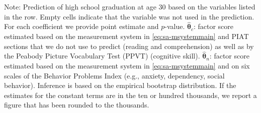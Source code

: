\documentclass[static]{JJH-Beamer}
\begin{document}
\begin{frame}
\begin{table}[H]
\begin{center}
{\begin{tabular}{lcccccccc}
\bottomrule
\end{tabular}
}
\end{center}
\tiny \flushleft
Note: Prediction of high school graduation at age 30 based on the variables listed in the row. Empty cells indicate that the variable was not used in the prediction. For each coefficient we provide point estimate and $p$-value. $\hat{\bm{\theta}}_{c}$: factor score estimated based on the measurement system in \eqref{eq:sa-msystemmain} and PIAT sections that we do not use to predict (reading and comprehension) as well as by the Peabody Picture Vocabulary Test (PPVT) (cognitive skill). $\hat{\bm{\theta}}_{n}$: factor score estimated based on the measurement system in \eqref{eq:sa-msystemmain} and on six scales of the Behavior Problems Index (e.g., anxiety, dependency, social behavior). Inference is based on the empirical bootstrap distribution. If the estimates for the constant terms are in the ten or hundred thousands, we report a figure that has been rounded to the thousands.\\
\end{table}

\end{frame}
\end{document}
